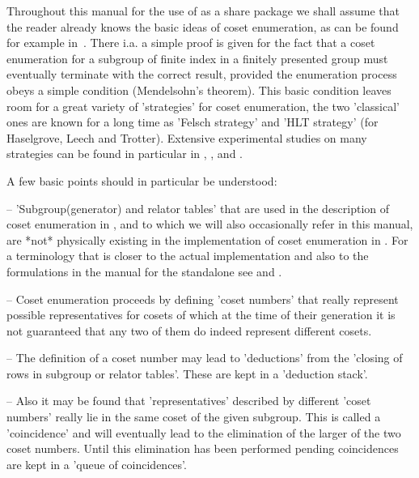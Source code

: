 Throughout this manual for the use of {\ACE} as a {\GAP} share package
we shall assume that the reader already knows the basic ideas of coset
enumeration,  as  can be  found  for  example in~\cite{Neu82}.   There
i.a. a simple proof is given for the fact that a coset enumeration for
a  subgroup  of  finite  index  in a  finitely  presented  group  must
eventually terminate with the correct result, provided the enumeration
process obeys  a simple  condition (Mendelsohn's theorem).  This basic
condition leaves  room for a  great variety of 'strategies'  for coset
enumeration, the  two 'classical'  ones are known  for a long  time as
'Felsch  strategy'  and  'HLT  strategy' (for  Haselgrove,  Leech  and
Trotter).  Extensive  experimental studies  on many strategies  can be
found in particular in \cite{CDHW73}, \cite{Hav91}, and \cite{HR99}.

A few basic points  should in particular be understood:

\beginlist

\item{--} 'Subgroup(generator)  and relator  tables' that are  used in
the description of coset enumeration  in \cite{Neu82}, and to which we
will  also occasionally  refer in  this manual,  are  *not* physically
existing in the implementation of  coset enumeration in {\ACE}.  For a
terminology that  is closer to  the actual implementation and  also to
the  formulations  in  the   manual  for  the  {\ACE}  standalone  see
\cite{CDHW73} and \cite{Hav91}.

\item{--} Coset enumeration proceeds  by defining 'coset numbers' that
really represent  possible representatives for cosets of  which at the
time of their generation it is  not guaranteed that any two of them do
indeed represent different cosets.

\item{--} The  definition of a  coset number may lead  to 'deductions'
from the 'closing  of rows in subgroup or  relator tables'. These are
kept in a 'deduction stack'.

\item{--}  Also it may  be found  that 'representatives'  described by
different 'coset  numbers' really lie in  the same coset  of the given
subgroup. This is  called a 'coincidence' and will  eventually lead to
the elimination  of the larger of  the two coset  numbers.  Until this
elimination  has been  performed pending  coincidences are  kept  in a
'queue of coincidences'.

